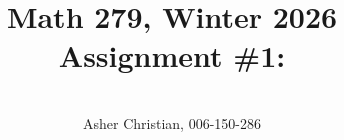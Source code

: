 \documentclass[11pt]{article}
\newcommand{\cnum}{Math 279}
\newcommand{\ced}{Winter 2026}
\newcommand{\ctitle}[4]{\title{\vspace{-0.5in}\cnum, \ced\\Assignment #1: #2}\author{\vspace{-0.35in}\\#3, #4}}
\begin{document}
\ctitle{\#1}{}{Asher Christian}{006-150-286}
\date{}
\maketitle
\end{document}
